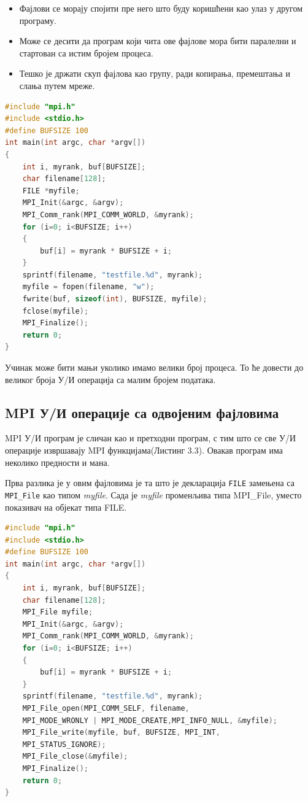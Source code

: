 \begin{itemize}
\item Фајлови се морају спојити пре него што буду коришћени као улаз у другом програму.
\item Може се десити да програм који чита ове фајлове мора бити паралелни и стартован са истим бројем процеса.
\item Тешко је држати скуп фајлова као групу, ради копирања, премештања и слања путем мреже.

\end{itemize}

\begin{lstlisting}[style=nonumbers,frame=single,language=C,caption= MPI програм без MPI улазно/излазних операција]
#include "mpi.h"
#include <stdio.h>
#define BUFSIZE 100
int main(int argc, char *argv[])
{
	int i, myrank, buf[BUFSIZE];
	char filename[128];
	FILE *myfile;
	MPI_Init(&argc, &argv);
	MPI_Comm_rank(MPI_COMM_WORLD, &myrank);
	for (i=0; i<BUFSIZE; i++)
	{
		buf[i] = myrank * BUFSIZE + i;
	}
	sprintf(filename, "testfile.%d", myrank);
	myfile = fopen(filename, "w");
	fwrite(buf, sizeof(int), BUFSIZE, myfile);
	fclose(myfile);
	MPI_Finalize();
	return 0;
}
\end{lstlisting}


Учинак може бити мањи уколико имамо велики број процеса. То ће довести до великог броја У/И операција са малим бројем података. 

\subsection{MPI У/И операције са одвојеним фајловима}
MPI У/И програм је сличан као и претходни програм, с тим што се све У/И операције извршавају MPI функцијама(Листинг 3.3). Овакав програм има неколико предности и мана.
 
Прва разлика је у овим фајловима је та што је декларација \texttt{FILE} замењена са \texttt{MPI\_File} као типом \textit{myfile}. Сада је \textit{myfile} променљива типа MPI\_File, уместо показивач на објекат типа FILE.

\begin{lstlisting}[style=nonumbers,frame=single,language=C, caption= MPI програм са одвојеним фајловима]
#include "mpi.h"
#include <stdio.h>
#define BUFSIZE 100
int main(int argc, char *argv[])
{
	int i, myrank, buf[BUFSIZE];
	char filename[128];
	MPI_File myfile;
	MPI_Init(&argc, &argv);
	MPI_Comm_rank(MPI_COMM_WORLD, &myrank);
	for (i=0; i<BUFSIZE; i++)
	{
		buf[i] = myrank * BUFSIZE + i;
	}
	sprintf(filename, "testfile.%d", myrank);
	MPI_File_open(MPI_COMM_SELF, filename,
	MPI_MODE_WRONLY | MPI_MODE_CREATE,MPI_INFO_NULL, &myfile);
	MPI_File_write(myfile, buf, BUFSIZE, MPI_INT,
	MPI_STATUS_IGNORE);
	MPI_File_close(&myfile);
	MPI_Finalize();
	return 0;
}
\end{lstlisting}


